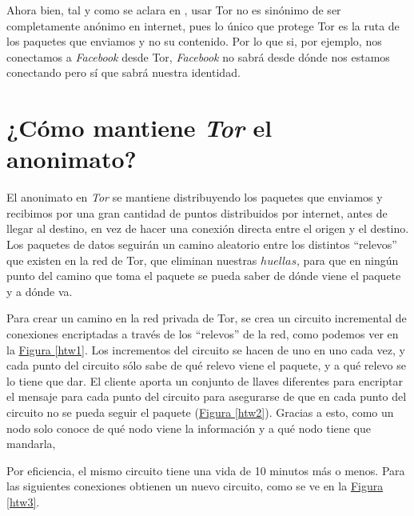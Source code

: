 \documentclass[10pt,a4paper,spanish]{article}
\begin{document}
Ahora bien, tal y como se aclara en \cite{anonymoustor}, usar Tor no es sinónimo de ser completamente anónimo en internet, pues lo único que protege Tor es la ruta de los paquetes que enviamos y no su contenido. Por lo que si, por ejemplo, nos conectamos a \textit{Facebook} desde Tor, \textit{Facebook} no sabrá desde dónde nos estamos conectando pero sí que sabrá nuestra identidad.

\section{¿Cómo mantiene \textit{Tor} el anonimato?}

El anonimato en \textit{Tor} se mantiene distribuyendo los paquetes que enviamos y recibimos por una gran cantidad de puntos distribuidos por internet, antes de llegar al destino, en vez de hacer una conexión directa entre el origen y el destino. Los paquetes de datos seguirán un camino aleatorio entre los distintos ``relevos'' que existen en la red de Tor, que eliminan nuestras $huellas$, para que en ningún punto del camino que toma el paquete se pueda saber de dónde viene el paquete y a dónde va.

Para crear un camino en la red privada de Tor, se crea un circuito incremental de conexiones encriptadas a través de los ``relevos'' de la red, como podemos ver en la \hyperref[htw1]{Figura \ref*{htw1}}. Los incrementos del circuito se hacen de uno en uno cada vez, y cada punto del circuito sólo sabe de qué relevo viene el paquete, y a qué relevo se lo tiene que dar. El cliente aporta un conjunto de llaves diferentes para encriptar el mensaje para cada punto del circuito para asegurarse de que en cada punto del circuito no se pueda seguir el paquete (\hyperref[htw2]{Figura \ref*{htw2}}). Gracias a esto, como un nodo solo conoce de qué nodo viene la información y a qué nodo tiene que mandarla, 

Por eficiencia, el mismo circuito tiene una vida de 10 minutos más o menos. Para las siguientes conexiones obtienen un nuevo circuito, como se ve en la \hyperref[htw3]{Figura \ref*{htw3}}.
\end{document}
